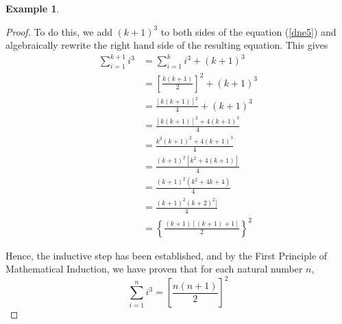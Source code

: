 \documentclass{book}
\theoremstyle{definition}
\newtheorem{example}{Example}[definition]
\theoremstyle{remark}
\begin{document}
\begin{example}
\begin{proof}
        To do this, we add $(k+1)^3$ to both sides of the equation (\ref{dne5}) and algebraically rewrite the right hand side of the resulting equation. This gives
            \begin{align*}
                \sum_{i=1}^{k+1}{i^3} & = \sum_{i=1}^{k}{i^3} + (k+1)^3 \\
                    & = \left [\frac{k(k+1)}{2} \right ]^2 + (k+1)^3 \\
                    & = \frac{[k(k+1)]^2}{4} + (k+1)^3 \\
                    & = \frac{[k(k+1)]^2 + 4(k+1)^3}{4} \\
                    & = \frac{k^2(k+1)^2 + 4(k+1)^3}{4} \\
                    & = \frac{(k+1)^2[k^2 + 4(k+1)]}{4} \\
                    & = \frac{(k+1)^2(k^2 + 4k + 4)}{4} \\
                    & = \frac{(k+1)^2(k + 2)^2]}{4} \\
                    & = \left \{ \frac{(k+1)[(k+1) + 1]}{2} \right \}^2
            \end{align*}
        
        Hence, the inductive step has been established, and by the First Principle of Mathematical Induction, we have proven that for each natural number $n$,
            \begin{equation*}
                \sum_{i=1}^{n}{i^3} = \left [\frac{n(n+1)}{2} \right ]^2
            \end{equation*}
    \end{proof}
\end{example}
\end{document}
